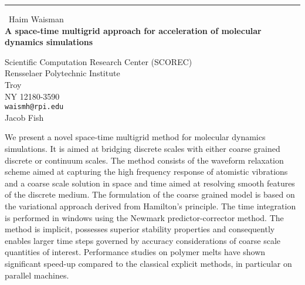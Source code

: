 \documentclass{report}
\begin{document}
\begin{center}
\rule{6in}{1pt} \
{\large Haim Waisman \\
{\bf A space-time multigrid approach for acceleration of molecular dynamics simulations}}

Scientific Computation Research Center (SCOREC) \\ Rensselaer Polytechnic Institute \\ Troy \\ NY 12180-3590
\\
{\tt waismh@rpi.edu}\\
Jacob Fish\end{center}

We present a novel space-time multigrid method for molecular
dynamics simulations. It is aimed at bridging discrete scales with either
coarse grained discrete or continuum scales. The method consists of the
waveform relaxation scheme aimed at capturing the high frequency response
of atomistic vibrations and a coarse scale solution in space and time
aimed at resolving smooth features of the discrete medium. The
formulation of the coarse grained model is based on the
variational approach derived from Hamilton's principle. The time
integration is performed in windows using the Newmark
predictor-corrector method. The method is implicit, possesses superior
stability properties and consequently enables larger time steps governed
by accuracy considerations of coarse scale quantities of interest.
Performance studies on polymer melts have shown significant speed-up
compared to the classical explicit methods, in particular on parallel
machines.
\end{document}
